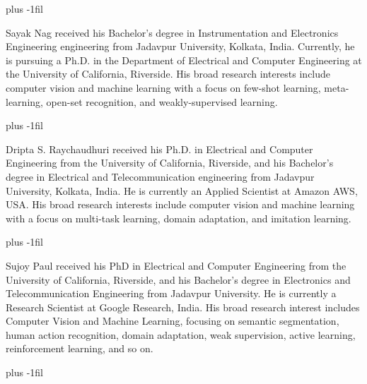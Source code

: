 \documentclass[10pt,journal,compsoc]{IEEEtran}
\begin{document}




\baselineskip plus -1fil
\begin{IEEEbiography}{Sayak Nag}
received his Bachelor’s degree in Instrumentation and Electronics Engineering engineering from Jadavpur University, Kolkata, India. Currently, he is pursuing a Ph.D. in the Department of Electrical and Computer Engineering at the University of California, Riverside. His broad research interests include computer vision and machine learning with a focus on few-shot learning, meta-learning, open-set recognition, and weakly-supervised learning.
\end{IEEEbiography}
\baselineskip plus -1fil
\begin{IEEEbiography}{Dripta S. Raychaudhuri} 
received his Ph.D. in Electrical and Computer Engineering from the University of California, Riverside, and his Bachelor’s degree in Electrical and Telecommunication engineering from Jadavpur University, Kolkata, India. He is currently an Applied Scientist at Amazon AWS, USA. His broad research interests include computer vision and machine learning with a focus on multi-task learning, domain adaptation, and imitation learning.
\end{IEEEbiography}
\baselineskip plus -1fil
\begin{IEEEbiography}
{Sujoy Paul} received his PhD in Electrical and Computer Engineering from the University of California, Riverside, and his Bachelor’s degree in Electronics and Telecommunication Engineering from Jadavpur University. 
He is currently a Research Scientist at Google Research, India. His broad research interest includes Computer Vision and Machine Learning, focusing on semantic segmentation, human action recognition, domain adaptation, weak supervision, active learning, reinforcement learning, and so on. 
\end{IEEEbiography}
\baselineskip plus -1fil
\end{document}
